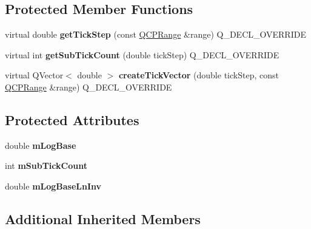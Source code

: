 \subsection*{Protected Member Functions}
\begin{DoxyCompactItemize}
\item 
\mbox{\label{class_q_c_p_axis_ticker_log_a57be974214a065d3247406331f02fa49}} 
virtual double {\bfseries get\+Tick\+Step} (const \mbox{\hyperlink{class_q_c_p_range}{Q\+C\+P\+Range}} \&range) Q\+\_\+\+D\+E\+C\+L\+\_\+\+O\+V\+E\+R\+R\+I\+DE
\item 
\mbox{\label{class_q_c_p_axis_ticker_log_a352fef7ae68837acd26e35188aa86167}} 
virtual int {\bfseries get\+Sub\+Tick\+Count} (double tick\+Step) Q\+\_\+\+D\+E\+C\+L\+\_\+\+O\+V\+E\+R\+R\+I\+DE
\item 
\mbox{\label{class_q_c_p_axis_ticker_log_af8873a8d1d2b9392d8f7a73218c889ab}} 
virtual Q\+Vector$<$ double $>$ {\bfseries create\+Tick\+Vector} (double tick\+Step, const \mbox{\hyperlink{class_q_c_p_range}{Q\+C\+P\+Range}} \&range) Q\+\_\+\+D\+E\+C\+L\+\_\+\+O\+V\+E\+R\+R\+I\+DE
\end{DoxyCompactItemize}
\subsection*{Protected Attributes}
\begin{DoxyCompactItemize}
\item 
\mbox{\label{class_q_c_p_axis_ticker_log_a4108bcc1cd68dcec54dc75667440d328}} 
double {\bfseries m\+Log\+Base}
\item 
\mbox{\label{class_q_c_p_axis_ticker_log_a3d92b729bedbbbd34ee5f74565defd95}} 
int {\bfseries m\+Sub\+Tick\+Count}
\item 
\mbox{\label{class_q_c_p_axis_ticker_log_aeba719bbeec39957f475ef89d6ae2fe7}} 
double {\bfseries m\+Log\+Base\+Ln\+Inv}
\end{DoxyCompactItemize}
\subsection*{Additional Inherited Members}


